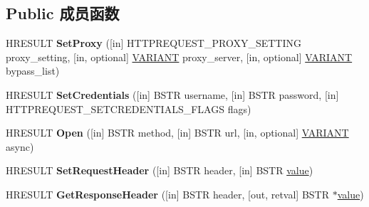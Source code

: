 \subsection*{Public 成员函数}
\begin{DoxyCompactItemize}
\item 
\mbox{\label{interface_win_http_1_1_i_win_http_request_a018028311be14b04aa0ebb28c5fe9f49}} 
H\+R\+E\+S\+U\+LT {\bfseries Set\+Proxy} (\mbox{[}in\mbox{]} H\+T\+T\+P\+R\+E\+Q\+U\+E\+S\+T\+\_\+\+P\+R\+O\+X\+Y\+\_\+\+S\+E\+T\+T\+I\+NG proxy\+\_\+setting, \mbox{[}in, optional\mbox{]} \hyperlink{structtag_v_a_r_i_a_n_t}{V\+A\+R\+I\+A\+NT} proxy\+\_\+server, \mbox{[}in, optional\mbox{]} \hyperlink{structtag_v_a_r_i_a_n_t}{V\+A\+R\+I\+A\+NT} bypass\+\_\+list)
\item 
\mbox{\label{interface_win_http_1_1_i_win_http_request_a04218722ce4c03bdf67a6ecb63ad9389}} 
H\+R\+E\+S\+U\+LT {\bfseries Set\+Credentials} (\mbox{[}in\mbox{]} B\+S\+TR username, \mbox{[}in\mbox{]} B\+S\+TR password, \mbox{[}in\mbox{]} H\+T\+T\+P\+R\+E\+Q\+U\+E\+S\+T\+\_\+\+S\+E\+T\+C\+R\+E\+D\+E\+N\+T\+I\+A\+L\+S\+\_\+\+F\+L\+A\+GS flags)
\item 
\mbox{\label{interface_win_http_1_1_i_win_http_request_a7f6d86cec90b4819618519c837802f0d}} 
H\+R\+E\+S\+U\+LT {\bfseries Open} (\mbox{[}in\mbox{]} B\+S\+TR method, \mbox{[}in\mbox{]} B\+S\+TR url, \mbox{[}in, optional\mbox{]} \hyperlink{structtag_v_a_r_i_a_n_t}{V\+A\+R\+I\+A\+NT} async)
\item 
\mbox{\label{interface_win_http_1_1_i_win_http_request_a795917afd3662b0c2d60f1c92892873b}} 
H\+R\+E\+S\+U\+LT {\bfseries Set\+Request\+Header} (\mbox{[}in\mbox{]} B\+S\+TR header, \mbox{[}in\mbox{]} B\+S\+TR \hyperlink{unionvalue}{value})
\item 
\mbox{\label{interface_win_http_1_1_i_win_http_request_a667c265dbbd61a041c88b6fcbfcabc41}} 
H\+R\+E\+S\+U\+LT {\bfseries Get\+Response\+Header} (\mbox{[}in\mbox{]} B\+S\+TR header, \mbox{[}out, retval\mbox{]} B\+S\+TR $\ast$\hyperlink{unionvalue}{value})
\item 
\mbox{\label{interface_win_http_1_1_i_win_http_request_a9da8658eedad8a3bd33b3ef962af81a7}} 

\end{DoxyCompactItemize}
